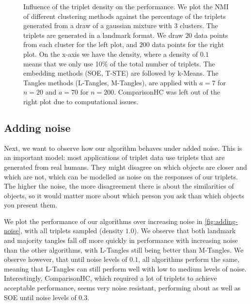 \onecolumn
\begin{figure}[ht]
    \centering
    \caption{
        Influence of the triplet density on the performance. We plot the NMI of different clustering methods against the percentage of the triplets generated from a draw of a gaussian mixture with $3$ clusters. The triplets are generated in a landmark format.
        We draw $20$ data points from each cluster for the left plot, and $200$ data points for the right plot.
        On the x-axis we have the density, where a density of $0.1$ means that we only use 10\% of the total number of triplets. The embedding methods (SOE, T-STE) are 
        followed by k-Means. The Tangles methods (L-Tangles, M-Tangles), are applied with $a=7$ for $n=20$ and $a=70$ for $n=200$. ComparisonHC was left out of the right plot due to computational issues.}
    \label{fig:density-change}
\end{figure}


\subsection{Adding noise}\label{sec:adding-noise}
Next, we want to observe how our algorithm behaves under added noise. This is an important model: most applications of triplet data use triplets that are generated from
real humans. They might disagree on which objects are closer and which are not, which can be modelled as noise on the responses of our triplets. The higher the noise, 
the more disagreement there is about the similarities of objects, so it would matter more about which person you ask than which objects you present them. 

We plot the performance of our algorithms over increasing noise in \autoref{fig:adding-noise}, 
with all triplets sampled (density $1.0$). 
We observe that both landmark and majority tangles fall off more quickly in performance with increasing noise 
than the other algorithms, with L-Tangles still being better than M-Tangles. 
We observe however, that until noise levels of $0.1$, all algorithms perform the same, meaning that L-Tangles can still perform well with low to medium levels of noise. Interestingly, ComparisonHC, which 
required a lot of triplets to achieve acceptable performance, seems 
very noise resistant, performing about as well as SOE until noise levels of 0.3.

